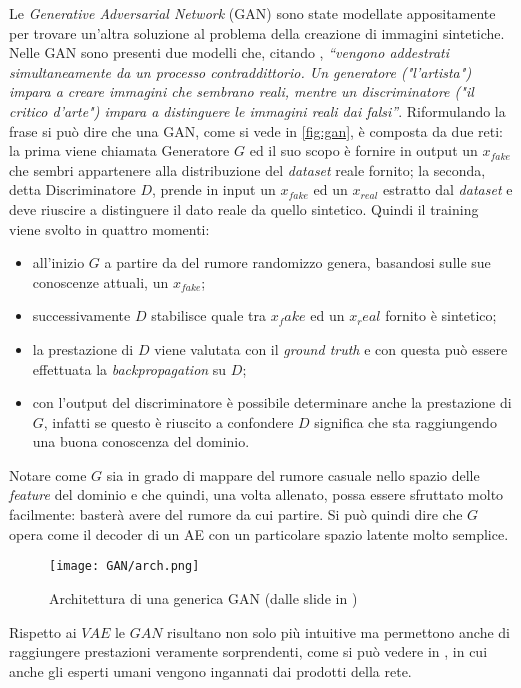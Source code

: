 Le \emph{Generative Adversarial Network} (GAN) sono state modellate appositamente per trovare un'altra soluzione al problema della creazione di immagini sintetiche.
Nelle GAN sono presenti due modelli che, citando \cite{GANTF}, \emph{``vengono addestrati simultaneamente da un processo contraddittorio. Un generatore ("l'artista") impara a creare immagini che sembrano reali, mentre un discriminatore ("il critico d'arte") impara a distinguere le immagini reali dai falsi''}.
Riformulando la frase si può dire che una GAN, come si vede in \autoref{fig:gan}, è composta da due reti: la prima viene chiamata Generatore $G$ ed il suo scopo è fornire in output un $x_{fake}$ che sembri appartenere alla distribuzione del \emph{dataset} reale fornito; la seconda, detta Discriminatore $D$, prende in input un $x_{fake}$ ed un $x_{real}$ estratto dal \emph{dataset} e deve riuscire a distinguere il dato reale da quello sintetico.
Quindi il training viene svolto in quattro momenti:
\begin{itemize}
  \item all'inizio $G$ a partire da del rumore randomizzo genera, basandosi sulle sue conoscenze attuali, un $x_{fake}$;
  \item successivamente $D$ stabilisce quale tra $x_fake$ ed un $x_real$ fornito è sintetico;
  \item la prestazione di $D$ viene valutata con il \emph{ground truth} e con questa può essere effettuata la \emph{backpropagation} su $D$;
  \item con l'output del discriminatore è possibile determinare anche la prestazione di $G$, infatti se questo è riuscito a confondere $D$ significa che sta raggiungendo una buona conoscenza del dominio.
\end{itemize}
Notare come $G$ sia in grado di mappare del rumore casuale nello spazio delle \emph{feature} del dominio e che quindi, una volta allenato, possa essere sfruttato molto facilmente: basterà avere del rumore da cui partire.
Si può quindi dire che $G$ opera come il decoder di un AE con un particolare spazio latente molto semplice.
\begin{figure}[ht]
  \centering
  \texttt{[image: GAN/arch.png]}
  \caption{Architettura di una generica GAN (dalle slide in \cite{MIT_GEN})}
  \label{fig:gan}
\end{figure}
Rispetto ai $VAE$ le $GAN$ risultano non solo più intuitive ma permettono anche di raggiungere prestazioni veramente sorprendenti, come si può vedere in \cite{GAN_HD}, in cui anche gli esperti umani vengono ingannati dai prodotti della rete.

